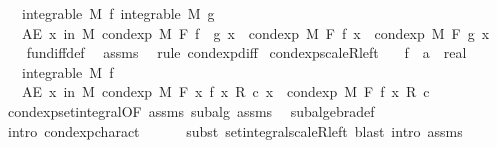 \begin{isabellebody}
\ \ \ {\isachardoublequoteopen}integrable\ M\ f{\isachardoublequoteclose}\ {\isachardoublequoteopen}integrable\ M\ g{\isachardoublequoteclose}\isanewline
\ \ \ {\isachardoublequoteopen}AE\ x\ in\ M{\isachardot}{\kern0pt}\ cond{\isacharunderscore}{\kern0pt}exp\ M\ F\ {\isacharparenleft}{\kern0pt}f\ {\isacharminus}{\kern0pt}\ g{\isacharparenright}{\kern0pt}\ x\ {\isacharequal}{\kern0pt}\ cond{\isacharunderscore}{\kern0pt}exp\ M\ F\ f\ x\ {\isacharminus}{\kern0pt}\ cond{\isacharunderscore}{\kern0pt}exp\ M\ F\ g\ x{\isachardoublequoteclose}\isanewline
%
\isadelimproof
\ \ %
\endisadelimproof
%
\isatagproof
{}\isamarkupfalse%
\ fun{\isacharunderscore}{\kern0pt}diff{\isacharunderscore}{\kern0pt}def\ \isamarkupfalse%
\ assms\ \isamarkupfalse%
\ {\isacharparenleft}{\kern0pt}rule\ cond{\isacharunderscore}{\kern0pt}exp{\isacharunderscore}{\kern0pt}diff{\isacharparenright}{\kern0pt}%
\endisatagproof
{\isafoldproof}%
%
\isadelimproof
\isanewline
%
\endisadelimproof
\isanewline
{}\isamarkupfalse%
\ cond{\isacharunderscore}{\kern0pt}exp{\isacharunderscore}{\kern0pt}scaleR{\isacharunderscore}{\kern0pt}left{\isacharcolon}{\kern0pt}\isanewline
\ \ \ f\ {\isacharcolon}{\kern0pt}{\isacharcolon}{\kern0pt}\ {\isachardoublequoteopen}{\isacharprime}{\kern0pt}a\ {\isasymRightarrow}\ real{\isachardoublequoteclose}\isanewline
\ \ \ {\isachardoublequoteopen}integrable\ M\ f{\isachardoublequoteclose}\isanewline
\ \ \ {\isachardoublequoteopen}AE\ x\ in\ M{\isachardot}{\kern0pt}\ cond{\isacharunderscore}{\kern0pt}exp\ M\ F\ {\isacharparenleft}{\kern0pt}{\isasymlambda}x{\isachardot}{\kern0pt}\ f\ x\ {\isacharasterisk}{\kern0pt}\isactrlsub R\ c{\isacharparenright}{\kern0pt}\ x\ {\isacharequal}{\kern0pt}\ cond{\isacharunderscore}{\kern0pt}exp\ M\ F\ f\ x\ {\isacharasterisk}{\kern0pt}\isactrlsub R\ c{\isachardoublequoteclose}\ \isanewline
%
\isadelimproof
\ \ %
\endisadelimproof
%
\isatagproof
{}\isamarkupfalse%
\ cond{\isacharunderscore}{\kern0pt}exp{\isacharunderscore}{\kern0pt}set{\isacharunderscore}{\kern0pt}integral{\isacharbrackleft}{\kern0pt}OF\ assms{\isacharbrackright}{\kern0pt}\ subalg\ assms\ \isamarkupfalse%
\ subalgebra{\isacharunderscore}{\kern0pt}def\isanewline
\ \ \isamarkupfalse%
\ {\isacharparenleft}{\kern0pt}intro\ cond{\isacharunderscore}{\kern0pt}exp{\isacharunderscore}{\kern0pt}charact{\isacharcomma}{\kern0pt}\isanewline
\ \ \ \ \ \ subst\ set{\isacharunderscore}{\kern0pt}integral{\isacharunderscore}{\kern0pt}scaleR{\isacharunderscore}{\kern0pt}left{\isacharcomma}{\kern0pt}\ blast{\isacharcomma}{\kern0pt}\ intro\ assms{\isacharcomma}{\kern0pt}\ \isanewline

\end{isabellebody}

